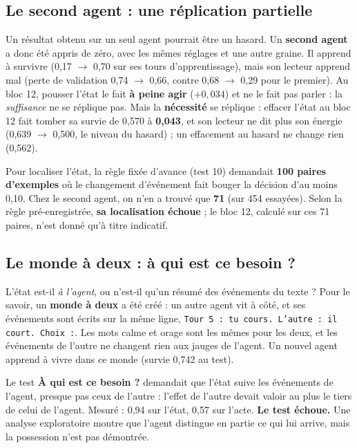 \documentclass[fontsize=10pt,paper=a4,parskip=half-]{scrartcl}
\newcommand{\q}[1]{\og #1\fg{}}
\begin{document}
\subsection{Le second agent : une réplication partielle}
Un résultat obtenu sur un seul agent pourrait être un hasard. Un \textbf{second agent} a
donc été appris de zéro, avec les mêmes réglages et une autre graine. Il apprend à
survivre (0,17 $\to$ 0,70 sur ses tours d'apprentissage), mais son lecteur apprend mal
(perte de validation 0,74 $\to$ 0,66, contre 0,68 $\to$ 0,29 pour le premier). Au bloc 12,
pousser l'état le fait \textbf{à peine agir} ($+0,034$) et ne le fait pas parler : la
\emph{suffisance} ne se réplique pas. Mais la \textbf{nécessité} se réplique : effacer
l'état au bloc 12 fait tomber sa survie de 0,570 à \textbf{0,043}, et son lecteur ne dit plus
son énergie (0,639 $\to$ 0,500, le niveau du hasard) ; un effacement au hasard ne change
rien (0,562).

\begin{limite}
Pour localiser l'état, la règle fixée d'avance (test 10) demandait \textbf{100 paires
d'exemples} où le changement d'événement fait bouger la décision d'au moins 0,10. Chez le
second agent, on n'en a trouvé que \textbf{71} (sur 454 essayées). Selon la règle
pré-enregistrée, \textbf{sa localisation échoue} ; le bloc 12, calculé sur ces 71 paires,
n'est donné qu'à titre indicatif.
\end{limite}

\subsection{Le monde à deux : à qui est ce besoin ?}
L'état est-il \emph{à l'agent}, ou n'est-il qu'un résumé des événements du texte ? Pour le
savoir, un \textbf{monde à deux} a été créé : un autre agent vit à côté, et ses événements
sont écrits sur la même ligne, \texttt{\small Tour 5 : tu cours. L'autre : il court. Choix :}.
Les mots \q{calme} et \q{orage} sont les mêmes pour les deux, et les événements de l'autre
ne changent rien aux jauges de l'agent. Un nouvel agent apprend à vivre dans ce monde
(survie 0,742 au test).

Le test \textbf{\q{À qui est ce besoin ?}} demandait que l'état suive les événements de
l'agent, presque pas ceux de l'autre : l'effet de l'autre devait valoir au plus le tiers
de celui de l'agent. Mesuré : 0,94 sur l'état, 0,57 sur l'acte. \textbf{Le test échoue.}
Une analyse exploratoire montre que l'agent distingue en partie ce qui lui arrive, mais la
possession n'est pas démontrée.
\end{document}
